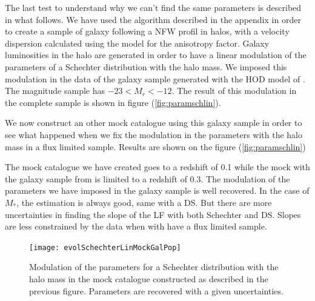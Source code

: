 The last test to understand why we can't find the same parameters is described in what follows. We have used the algorithm described
in the appendix  in order to create a
sample of galaxy following a NFW profil in halos, with a velocity dispersion calculated using the \citet{ML05} model for the
anisotropy factor. Galaxy luminosities in the halo are generated in order to have a linear modulation of the parameters of a
Schechter distribution with the halo mass. We imposed this modulation in the data of the galaxy sample generated with the HOD model
of \cite{Zehavi+11}. The magnitude sample has $\num{-23}<M_r<\num{-12}$. The result of this modulation in the complete sample is
shown in figure (\ref{fig:paramschlin}).

We now construct an other mock catalogue using this galaxy sample in order to see what happened when we fix the modulation in the
parameters with the halo mass in a flux limited sample.
Results are shown on the figure (\ref{fig:paramschlin})

The mock catalogue we have created goes to a redshift of \num{0.1} while the mock with the galaxy sample from \citet{Guo+11} is
limited to a redshift of \num{0.3}.
The modulation of the parameters we have imposed in the galaxy sample is well recovered. In the case of $M_*$, the estimation
is always good, same with a DS. But there are more uncertainties in finding the slope of the LF with both Schechter and DS. Slopes
are less constrained by the data when with have a flux limited sample.
\begin{figure}[htb]
	\centering
	\texttt{[image: evolSchechterLinMockGalPop]}
	\caption{\footnotesize{}Modulation of the parameters for a Schechter distribution with the halo mass in the mock catalogue
	constructed as described in the previous figure. Parameters are recovered with a given uncertainties.}
	\label{fig:paramschlinmock}
\end{figure}

\scriptsize{\cbleu{}}
\normalsize

